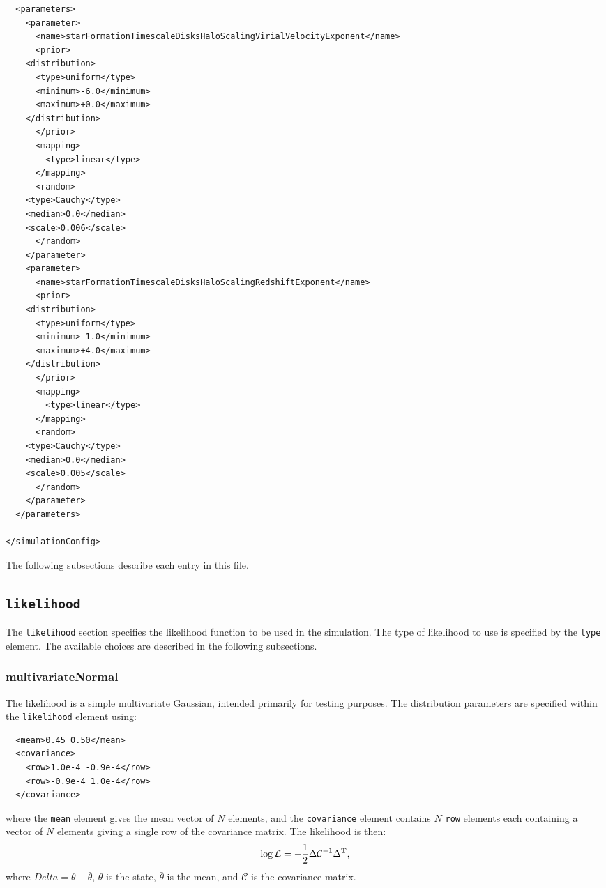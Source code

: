 \begin{verbatim}
  <parameters>
    <parameter>
      <name>starFormationTimescaleDisksHaloScalingVirialVelocityExponent</name>
      <prior>
	<distribution>
	  <type>uniform</type>
	  <minimum>-6.0</minimum>
	  <maximum>+0.0</maximum>
	</distribution>
      </prior>
      <mapping>
        <type>linear</type>
      </mapping>
      <random>
	<type>Cauchy</type>
	<median>0.0</median>
	<scale>0.006</scale>
      </random>
    </parameter>
    <parameter>
      <name>starFormationTimescaleDisksHaloScalingRedshiftExponent</name>
      <prior>
	<distribution>
	  <type>uniform</type>
	  <minimum>-1.0</minimum>
	  <maximum>+4.0</maximum>
	</distribution> 
      </prior>
      <mapping>
        <type>linear</type>
      </mapping>
      <random>
	<type>Cauchy</type>
	<median>0.0</median>
	<scale>0.005</scale>
      </random>
    </parameter>
  </parameters>
  
</simulationConfig>
\end{verbatim}

The following subsections describe each entry in this file.

\subsection{{\tt likelihood}}

The {\tt likelihood} section specifies the likelihood function to be used in the simulation. The type of likelihood to use is specified by the {\tt type} element. The available choices are described in the following subsections.

\subsubsection{multivariateNormal}

The likelihood is a simple multivariate Gaussian, intended primarily for testing purposes. The distribution parameters are specified within the {\tt likelihood} element using:
\begin{verbatim}
  <mean>0.45 0.50</mean>
  <covariance>
    <row>1.0e-4 -0.9e-4</row>
    <row>-0.9e-4 1.0e-4</row>
  </covariance>
\end{verbatim}
where the {\tt mean} element gives the mean vector of $N$ elements, and the {\tt covariance} element contains $N$ {\tt row} elements each containing a vector of $N$ elements giving a single row of the covariance matrix. The likelihood is then:
\begin{equation}
\log \mathcal{L} = - {1 \over 2} \Delta \mathcal{C}^{-1} \Delta^{\rm T},
\end{equation}
where $Delta = \theta - \bar{\theta}$, $\theta$ is the state, $\bar{\theta}$ is the mean, and $\mathcal{C}$ is the covariance matrix.

